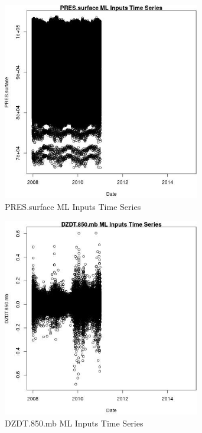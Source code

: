 \begin{figure} 
\centering  
\includegraphics[width=0.77\textwidth]{Code_Outputs/ML_input_report_ML_input_PM25_Step5_part_d_de_duplicated_aves_ML_input_PRESsurfacevDate.jpg} 
\caption{\label{fig:ML_input_report_ML_input_PM25_Step5_part_d_de_duplicated_aves_ML_inputPRESsurfacevDate}PRES.surface ML Inputs Time Series} 
\end{figure} 
 

\clearpage 

\begin{figure} 
\centering  
\includegraphics[width=0.77\textwidth]{Code_Outputs/ML_input_report_ML_input_PM25_Step5_part_d_de_duplicated_aves_ML_input_DZDT850mbvDate.jpg} 
\caption{\label{fig:ML_input_report_ML_input_PM25_Step5_part_d_de_duplicated_aves_ML_inputDZDT850mbvDate}DZDT.850.mb ML Inputs Time Series} 
\end{figure} 
 

